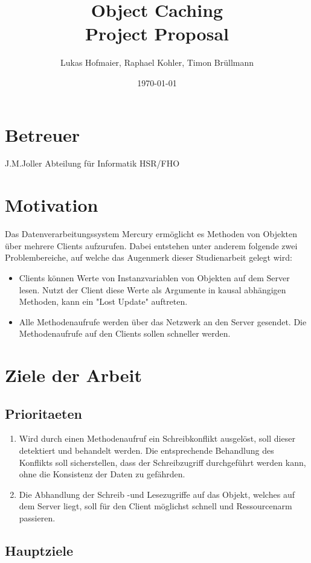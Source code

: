 \documentclass{article}
\title{Object Caching\\Project Proposal}
\author{Lukas Hofmaier, Raphael Kohler, Timon Brüllmann}
\date{\today}
\begin{document}
\maketitle
\section{Betreuer}
J.M.Joller  Abteilung für Informatik HSR/FHO

\section{Motivation}
Das Datenverarbeitungssystem Mercury ermöglicht es Methoden von Objekten über mehrere Clients aufzurufen. Dabei entstehen unter anderem folgende zwei Problembereiche, auf welche das Augenmerk dieser Studienarbeit gelegt wird:

\begin{itemize}
\item Clients können Werte von Instanzvariablen von Objekten auf dem Server lesen. Nutzt der Client diese Werte als Argumente in kausal abhängigen Methoden, kann ein "Lost Update" auftreten.
\item Alle Methodenaufrufe werden über das Netzwerk an den Server gesendet. Die Methodenaufrufe auf den Clients sollen schneller werden.
\end{itemize}

\section{Ziele der Arbeit}

\subsection{Prioritaeten}
\label{sec:prioritaeten}

\begin{enumerate}
\item Wird durch einen Methodenaufruf ein Schreibkonflikt ausgelöst, soll dieser detektiert und behandelt werden. Die entsprechende Behandlung des Konflikts soll sicherstellen, dass der Schreibzugriff durchgeführt werden kann, ohne die Konsistenz der Daten zu gefährden.
\item Die Abhandlung der Schreib -und Lesezugriffe auf das Objekt, welches auf dem Server liegt, soll für den Client möglichst schnell und Ressourcenarm passieren.
\end{enumerate}

\subsection{Hauptziele}
\label{sec:hauptziele}
\end{document}
